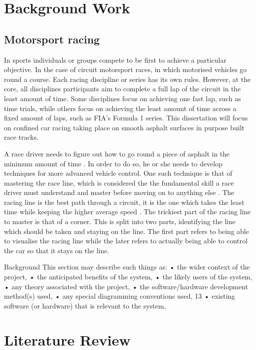 \section{Background Work}

\subsection{Motorsport racing}

In sports individuals or groups compete to be first to achieve a particular objective. In the case of circuit motorsport races, in which motorised vehicles go round a course. Each racing discipline or series has its own rules. However, at the core, all disciplines participants aim to complete a full lap of the circuit in the least amount of time. Some disciplines focus on achieving one fast lap, such as time trials, while others focus on achieving the least amount of time across a fixed amount of laps, such as FIA's Formula 1 series. This dissertation will focus on confined car racing taking place on smooth asphalt surfaces in purpose built race tracks. 

A race driver needs to figure out how to go round a piece of asphalt in the minimum amount of time \cite{GoingFaster}. In order to do so, he or she needs to develop techniques for more advanced vehicle control. One such technique is that of mastering the race line, which is considered the the fundamental skill a race driver must understand and master before moving on to anything else \cite{GoingFaster}. The racing line is the best path through a circuit, it is the one which takes the least time while keeping the higher average speed \cite{beckman1991physics}. The trickiest part of the racing line to master is that of a corner. This is split into two parts, identifying the line which should be taken and staying on the line. The first part refers to being able to visualise the racing line while the later refers to actually being able to control the car so that it stays on the line. 

Background
This section may describe such things as:
• the wider context of the project,
• the anticipated benefits of the system,
• the likely users of the system,
• any theory associated with the project,
• the software/hardware development method(s) used,
• any special diagramming conventions used, 13
• existing software (or hardware) that is relevant to the system, 

\section{Literature Review}

